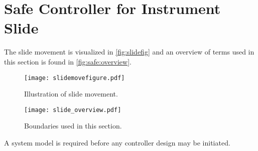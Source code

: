\section{Safe Controller for Instrument Slide}
The slide movement is visualized in \autoref{fig:slidefig} and an overview of terms used in this section is found in \autoref{fig:safe:overview}.
\begin{figure}[H]
    \centering
    \begin{minipage}{.5\textwidth}
        \centering
        \texttt{[image: slidemovefigure.pdf]}
        \caption{Illustration of slide movement.}
        \label{fig:slidefig}
    \end{minipage}%
    \begin{minipage}{0.5\textwidth}
        \centering
        \texttt{[image: slide\_overview.pdf]}
        \caption{Boundaries used in this section.}
        \label{fig:safe:overview}
    \end{minipage}
\end{figure}
A system model is required before any controller design may be initiated.
